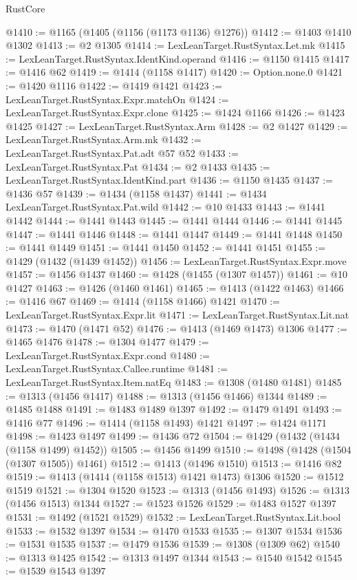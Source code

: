 \begin{lexlean}{RustCore}
\begin{coremodule}
@1410 := @1165 (@1405 (@1156 (@1173 @1136) @1276))
@1412 := @1403 @1410 @1302
@1413 := @2 @1305
@1414 := LexLeanTarget.RustSyntax.Let.mk
@1415 := LexLeanTarget.RustSyntax.IdentKind.operand
@1416 := @1150 @1415
@1417 := @1416 @62
@1419 := @1414 (@1158 @1417)
@1420 := Option.none.{0}
@1421 := @1420 @1116
@1422 := @1419 @1421
@1423 := LexLeanTarget.RustSyntax.Expr.matchOn
@1424 := LexLeanTarget.RustSyntax.Expr.clone
@1425 := @1424 @1166
@1426 := @1423 @1425
@1427 := LexLeanTarget.RustSyntax.Arm
@1428 := @2 @1427
@1429 := LexLeanTarget.RustSyntax.Arm.mk
@1432 := LexLeanTarget.RustSyntax.Pat.adt @57 @52
@1433 := LexLeanTarget.RustSyntax.Pat
@1434 := @2 @1433
@1435 := LexLeanTarget.RustSyntax.IdentKind.part
@1436 := @1150 @1435
@1437 := @1436 @57
@1439 := @1434 (@1158 @1437)
@1441 := @1434 LexLeanTarget.RustSyntax.Pat.wild
@1442 := @10 @1433
@1443 := @1441 @1442
@1444 := @1441 @1443
@1445 := @1441 @1444
@1446 := @1441 @1445
@1447 := @1441 @1446
@1448 := @1441 @1447
@1449 := @1441 @1448
@1450 := @1441 @1449
@1451 := @1441 @1450
@1452 := @1441 @1451
@1455 := @1429 (@1432 (@1439 @1452))
@1456 := LexLeanTarget.RustSyntax.Expr.move
@1457 := @1456 @1437
@1460 := @1428 (@1455 (@1307 @1457))
@1461 := @10 @1427
@1463 := @1426 (@1460 @1461)
@1465 := @1413 (@1422 @1463)
@1466 := @1416 @67
@1469 := @1414 (@1158 @1466) @1421
@1470 := LexLeanTarget.RustSyntax.Expr.lit
@1471 := LexLeanTarget.RustSyntax.Lit.nat
@1473 := @1470 (@1471 @52)
@1476 := @1413 (@1469 @1473) @1306
@1477 := @1465 @1476
@1478 := @1304 @1477
@1479 := LexLeanTarget.RustSyntax.Expr.cond
@1480 := LexLeanTarget.RustSyntax.Callee.runtime
@1481 := LexLeanTarget.RustSyntax.Item.natEq
@1483 := @1308 (@1480 @1481)
@1485 := @1313 (@1456 @1417)
@1488 := @1313 (@1456 @1466) @1344
@1489 := @1485 @1488
@1491 := @1483 @1489 @1397
@1492 := @1479 @1491
@1493 := @1416 @77
@1496 := @1414 (@1158 @1493) @1421
@1497 := @1424 @1171
@1498 := @1423 @1497
@1499 := @1436 @72
@1504 := @1429 (@1432 (@1434 (@1158 @1499) @1452))
@1505 := @1456 @1499
@1510 := @1498 (@1428 (@1504 (@1307 @1505)) @1461)
@1512 := @1413 (@1496 @1510)
@1513 := @1416 @82
@1519 := @1413 (@1414 (@1158 @1513) @1421 @1473) @1306
@1520 := @1512 @1519
@1521 := @1304 @1520
@1523 := @1313 (@1456 @1493)
@1526 := @1313 (@1456 @1513) @1344
@1527 := @1523 @1526
@1529 := @1483 @1527 @1397
@1531 := @1492 (@1521 @1529)
@1532 := LexLeanTarget.RustSyntax.Lit.bool
@1533 := @1532 @1397
@1534 := @1470 @1533
@1535 := @1307 @1534
@1536 := @1531 @1535
@1537 := @1479 @1536
@1539 := @1308 (@1309 @62)
@1540 := @1313 @1425
@1542 := @1313 @1497 @1344
@1543 := @1540 @1542
@1545 := @1539 @1543 @1397

\end{coremodule}
\end{lexlean}
